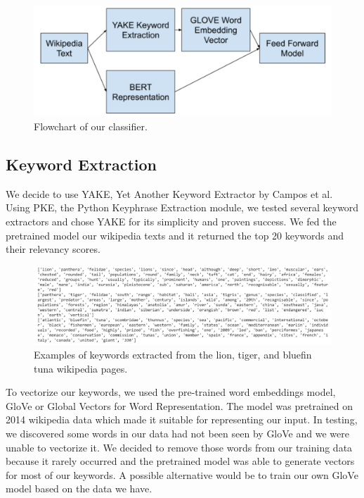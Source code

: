 \documentclass[10pt,twocolumn,letterpaper]{article}
\begin{document}
\begin{figure}[h]
  \includegraphics[width=\linewidth]{classifier_overview.png}
  \caption{Flowchart of our classifier.}
  \label{fig:classifier_overview}
\end{figure}

\subsection{Keyword Extraction}
We decide to use YAKE, Yet Another Keyword Extractor by Campos et al. Using PKE, the Python Keyphrase Extraction module, we tested several keyword extractors and chose YAKE for its simplicity and proven success. We fed the pretrained model our wikipedia texts and it returned the top 20 keywords and their relevancy scores. 
\begin{figure}
  \includegraphics[width=\linewidth]{keywords_example.png}
  \caption{Examples of keywords extracted from the lion, tiger, and bluefin tuna wikipedia pages.}
  \label{fig:keywords_example}
\end{figure}

To vectorize our keywords, we used the pre-trained word embeddings model, GloVe or Global Vectors for Word Representation. The model was pretrained on 2014 wikipedia data which made it suitable for representing our input. In testing, we discovered some words in our data had not been seen by GloVe and we were unable to vectorize it. We decided to remove those words from our training data because it rarely occurred and the pretrained model was able to generate vectors for most of our keywords. A possible alternative would be to train our own GloVe model based on the data we have. 
\end{document}
